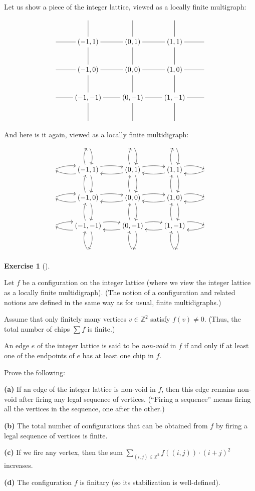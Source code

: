 \documentclass[numbers=enddot,12pt,final,onecolumn,notitlepage]{scrartcl}%
\makeatletter
\newcounter{exer}
\theoremstyle{definition}
\newtheorem{exmp}[exer]{Exercise}
\newenvironment{exercise}[1][]
{\begin{exmp}[#1]\begin{leftbar}}
{\end{leftbar}\end{exmp}}
\let\sumnonlimits\sum
\renewcommand{\sum}{\sumnonlimits\limits}
\newcommand{\ZZ}{\mathbb{Z}}
\newcommand{\tup}[1]{\left( #1 \right)}
\newcommand{\are}{\ar@{-}}
\newcommand{\arebi}[1][]{\ar@{<-}@/_/[#1] \ar@/^/[#1]}
\makeatother
\begin{document}
Let us show a piece of the integer lattice, viewed as
a locally finite multigraph:
\[
\xymatrix{
& \are[d] & \are[d] & \are[d] & \\
\are[r] & \tup{-1, 1} \are[d] \are[r] & \tup{0, 1} \are[d] \are[r] & \tup{1, 1} \are[d] \are[r] & \\
\are[r] & \tup{-1, 0} \are[d] \are[r] & \tup{0, 0} \are[d] \are[r] & \tup{1, 0} \are[d] \are[r] & \\
\are[r] & \tup{-1, -1} \are[d] \are[r] & \tup{0, -1} \are[d] \are[r] & \tup{1, -1} \are[d] \are[r] & \\
& & & &
}
\]
And here is it again, viewed as a locally finite
multidigraph:
\[
\xymatrix{
& \arebi[d] & \arebi[d] & \arebi[d] & \\
\arebi[r] & \tup{-1, 1} \arebi[d] \arebi[r] & \tup{0, 1} \arebi[d] \arebi[r] & \tup{1, 1} \arebi[d] \arebi[r] & \\
\arebi[r] & \tup{-1, 0} \arebi[d] \arebi[r] & \tup{0, 0} \arebi[d] \arebi[r] & \tup{1, 0} \arebi[d] \arebi[r] & \\
\arebi[r] & \tup{-1, -1} \arebi[d] \arebi[r] & \tup{0, -1} \arebi[d] \arebi[r] & \tup{1, -1} \arebi[d] \arebi[r] & \\
& & & &
}
\]

\begin{exercise} \label{exe.chip.Z2}
Let $f$ be a configuration on the integer lattice
(where we view the integer lattice as a locally
finite multidigraph).
(The notion of a configuration and related notions
are defined in the same way as for usual, finite
multidigraphs.)

Assume that only finitely many vertices $v \in \ZZ^2$
satisfy $f \tup{v} \neq 0$.
(Thus, the total number of chips $\sum f$ is finite.)

An edge $e$ of the integer lattice is
said to be \textit{non-void} in $f$ if and only if
at least one of the endpoints of $e$ has at least one
chip in $f$.

Prove the following:

\textbf{(a)} If an edge of the integer lattice is
non-void in $f$, then this edge remains non-void after
firing any legal sequence of vertices.
(``Firing a sequence'' means firing all the vertices
in the sequence, one after the other.)

\textbf{(b)} The total number of configurations that
can be obtained from $f$ by firing a legal sequence
of vertices is finite.

\textbf{(c)} If we fire any vertex, then the
sum $\sum_{\tup{i, j} \in \ZZ^2} f \tup{\tup{i, j}}
\cdot \tup{i + j}^2$ increases.

\textbf{(d)} The configuration $f$ is finitary (so its
stabilization is well-defined).
\end{exercise}
\end{document}
